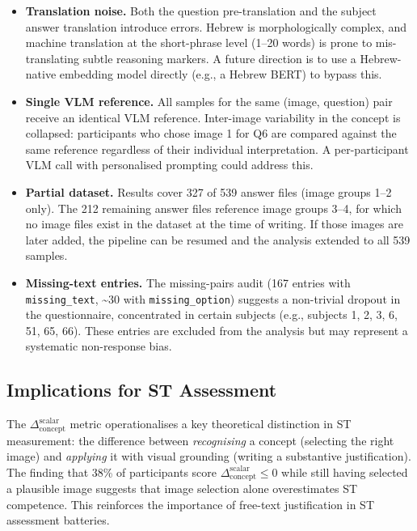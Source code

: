 \documentclass[12pt,a4paper]{article}
\newcommand{\SACs}{\ensuremath{\Delta_{\text{concept}}^{\text{scalar}}}}
\begin{document}
\begin{itemize}
  \item \textbf{Translation noise.} Both the question pre-translation and the subject
        answer translation introduce errors.  Hebrew is morphologically complex, and
        machine translation at the short-phrase level (1--20 words) is prone to 
        mis-translating subtle reasoning markers.  A future direction is to use a
        Hebrew-native embedding model directly (e.g., a Hebrew BERT) to bypass this.
  \item \textbf{Single VLM reference.} All samples for the same (image, question) pair
        receive an identical VLM reference.  Inter-image variability in the concept
        is collapsed: participants who chose image 1 for Q6 are compared against the
        same reference regardless of their individual interpretation.  A per-participant
        VLM call with personalised prompting could address this.
  \item \textbf{Partial dataset.} Results cover 327 of 539 answer files (image
        groups 1--2 only).  The 212 remaining answer files reference image groups 3--4,
        for which no image files exist in the dataset at the time of writing.
        If those images are later added, the pipeline can be resumed and the analysis
        extended to all 539 samples.
  \item \textbf{Missing-text entries.} The missing-pairs audit (167 entries with
        \texttt{missing\_text}, \textasciitilde{}30 with \texttt{missing\_option})
        suggests a non-trivial dropout in the questionnaire, concentrated in certain
        subjects (e.g., subjects 1, 2, 3, 6, 51, 65, 66).  These entries are excluded
        from the analysis but may represent a systematic non-response bias.
\end{itemize}

\subsection{Implications for ST Assessment}

The \SACs{} metric operationalises a key theoretical distinction in ST measurement:
the difference between \emph{recognising} a concept (selecting the right image) and
\emph{applying} it with visual grounding (writing a substantive justification).
The finding that 38\% of participants score $\SACs{} \le 0$ while still having selected
a plausible image suggests that image selection alone overestimates ST competence.
This reinforces the importance of free-text justification in ST assessment batteries.
\end{document}

